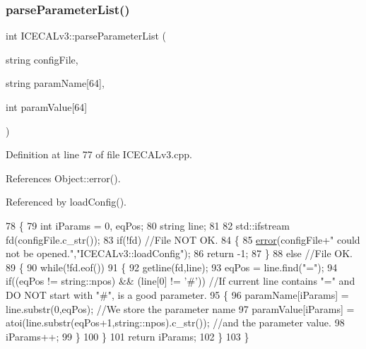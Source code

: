 \subsubsection{\texorpdfstring{parse\+Parameter\+List()}{parseParameterList()}}
{\footnotesize\ttfamily int I\+C\+E\+C\+A\+Lv3\+::parse\+Parameter\+List (\begin{DoxyParamCaption}\item[{string}]{config\+File,  }\item[{string}]{param\+Name\mbox{[}64\mbox{]},  }\item[{int}]{param\+Value\mbox{[}64\mbox{]} }\end{DoxyParamCaption})\hspace{0.3cm}{\ttfamily [private]}}



Definition at line 77 of file I\+C\+E\+C\+A\+Lv3.\+cpp.



References Object\+::error().



Referenced by load\+Config().


\begin{DoxyCode}
78 \{
79     \textcolor{keywordtype}{int} iParams = 0, eqPos;
80     \textcolor{keywordtype}{string} line;    
81 
82     std::ifstream fd(configFile.c\_str());
83     \textcolor{keywordflow}{if}(!fd)                                 \textcolor{comment}{//File NOT OK.}
84     \{
85         \hyperlink{classObject_a204a95f57818c0f811933917a30eff45}{error}(configFile+\textcolor{stringliteral}{" could not be opened."},\textcolor{stringliteral}{"ICECALv3::loadConfig"});
86         \textcolor{keywordflow}{return} -1;
87   \}
88     \textcolor{keywordflow}{else}                                        \textcolor{comment}{//File OK.}
89     \{
90         \textcolor{keywordflow}{while}(!fd.eof())                                    
91         \{
92             getline(fd,line);
93             eqPos = line.find(\textcolor{stringliteral}{"="});
94             \textcolor{keywordflow}{if}((eqPos != string::npos) && (line[0] != \textcolor{charliteral}{'#'}))     \textcolor{comment}{//If current line contains "=" and DO NOT
       start with "#", is a good parameter.}
95             \{
96                 paramName[iParams]  = line.substr(0,eqPos);                                                         \textcolor{comment}{
      //We store the parameter name}
97                 paramValue[iParams] = atoi(line.substr(eqPos+1,string::npos).c\_str());  \textcolor{comment}{//and the parameter
       value.}
98                 iParams++;
99             \}
100         \}
101         \textcolor{keywordflow}{return} iParams;
102     \}
103 \}
\end{DoxyCode}
\mbox{\label{classICECALv3_a33afc7c8e0f399336152abd03cbe8d1b}} 
